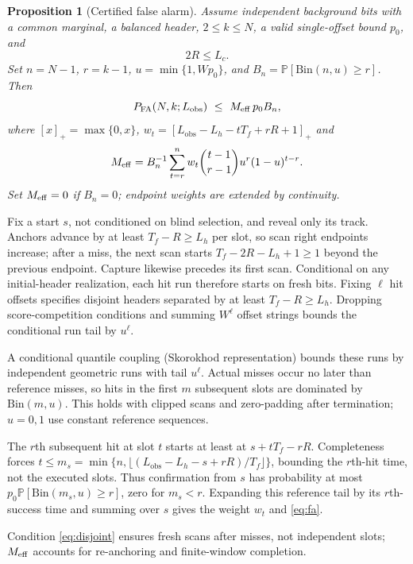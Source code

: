 \documentclass[journal]{IEEEtran}
\newcommand{\Tf}{T_f}
\newcommand{\Lobs}{L_{\mathrm{obs}}}
\newcommand{\Lh}{L_h}
\newcommand{\Prob}{\mathbb{P}}
\newcommand{\Bin}{\mathrm{Bin}}
\newtheorem{proposition}{Proposition}
\begin{document}
\begin{proposition}[Certified false alarm]
\label{thm:fa}
Assume independent background bits with a common marginal, a balanced header, $2\le k\le N$, a valid single-offset bound $p_0$, and
\begin{equation}
2R\le L_c.
\label{eq:disjoint}
\end{equation}
Set $n=N-1$, $r=k-1$, $u=\min\{1,Wp_0\}$, and $B_n=\Prob[\Bin(n,u)\ge r]$. Then
\begin{equation}
P_{\mathrm{FA}}(N,k;\Lobs)\ \le\ M_{\rm eff}\,p_0 B_n,
\label{eq:fa}
\end{equation}
where $[x]_+=\max\{0,x\}$, $w_t=[\Lobs-\Lh-t\Tf+rR+1]_+$ and
\[
M_{\rm eff}=B_n^{-1}\sum_{t=r}^{n}w_t\binom{t-1}{r-1}u^r(1-u)^{t-r}.
\]
Set $M_{\rm eff}=0$ if $B_n=0$; endpoint weights are extended by continuity.
\end{proposition}
\begin{IEEEproof}
Fix a start $s$, not conditioned on blind selection, and reveal only its track. Anchors advance by at least $\Tf-R\ge\Lh$ per slot, so scan right endpoints increase; after a miss, the next scan starts $\Tf-2R-\Lh+1\ge1$ beyond the previous endpoint. Capture likewise precedes its first scan. Conditional on any initial-header realization, each hit run therefore starts on fresh bits. Fixing $\ell$ hit offsets specifies disjoint headers separated by at least $\Tf-R\ge\Lh$. Dropping score-competition conditions and summing $W^\ell$ offset strings bounds the conditional run tail by $u^\ell$.

A conditional quantile coupling (Skorokhod representation) bounds these runs by independent geometric runs with tail $u^\ell$. Actual misses occur no later than reference misses, so hits in the first $m$ subsequent slots are dominated by $\Bin(m,u)$. This holds with clipped scans and zero-padding after termination; $u=0,1$ use constant reference sequences.

The $r$th subsequent hit at slot $t$ starts at least at $s+t\Tf-rR$. Completeness forces $t\le m_s=\min\{n,\lfloor(\Lobs-\Lh-s+rR)/\Tf\rfloor\}$, bounding the $r$th-hit time, not the executed slots. Thus confirmation from $s$ has probability at most $p_0\Prob[\Bin(m_s,u)\ge r]$, zero for $m_s<r$. Expanding this reference tail by its $r$th-success time and summing over $s$ gives the weight $w_t$ and \eqref{eq:fa}.
\end{IEEEproof}

Condition \eqref{eq:disjoint} ensures fresh scans after misses, not independent slots; $M_{\rm eff}$ accounts for re-anchoring and finite-window completion.
\end{document}
